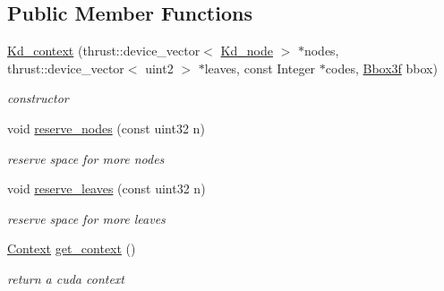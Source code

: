 \subsection*{\-Public \-Member \-Functions}
\begin{DoxyCompactItemize}
\item 
\hypertarget{structnih_1_1cuda_1_1kd_1_1_kd__context_ab65e1eae4bb0d30693b5b2a7a2155afa}{
\hyperlink{structnih_1_1cuda_1_1kd_1_1_kd__context_ab65e1eae4bb0d30693b5b2a7a2155afa}{\-Kd\-\_\-context} (thrust\-::device\-\_\-vector$<$ \hyperlink{structnih_1_1_kd__node}{\-Kd\-\_\-node} $>$ $\ast$nodes, thrust\-::device\-\_\-vector$<$ uint2 $>$ $\ast$leaves, const \-Integer $\ast$codes, \hyperlink{structnih_1_1_bbox}{\-Bbox3f} bbox)}
\label{structnih_1_1cuda_1_1kd_1_1_kd__context_ab65e1eae4bb0d30693b5b2a7a2155afa}

\begin{DoxyCompactList}\small\item\em constructor \end{DoxyCompactList}\item 
\hypertarget{structnih_1_1cuda_1_1kd_1_1_kd__context_a37662afab45803d4cdc90af6e98d5d74}{
void \hyperlink{structnih_1_1cuda_1_1kd_1_1_kd__context_a37662afab45803d4cdc90af6e98d5d74}{reserve\-\_\-nodes} (const uint32 n)}
\label{structnih_1_1cuda_1_1kd_1_1_kd__context_a37662afab45803d4cdc90af6e98d5d74}

\begin{DoxyCompactList}\small\item\em reserve space for more nodes \end{DoxyCompactList}\item 
\hypertarget{structnih_1_1cuda_1_1kd_1_1_kd__context_a69c93f66508e6fa8f10e7d21d77d0224}{
void \hyperlink{structnih_1_1cuda_1_1kd_1_1_kd__context_a69c93f66508e6fa8f10e7d21d77d0224}{reserve\-\_\-leaves} (const uint32 n)}
\label{structnih_1_1cuda_1_1kd_1_1_kd__context_a69c93f66508e6fa8f10e7d21d77d0224}

\begin{DoxyCompactList}\small\item\em reserve space for more leaves \end{DoxyCompactList}\item 
\hypertarget{structnih_1_1cuda_1_1kd_1_1_kd__context_a90b3e77ba2b9eaf6851117bb07cc06be}{
\hyperlink{structnih_1_1cuda_1_1kd_1_1_kd__context_1_1_context}{\-Context} \hyperlink{structnih_1_1cuda_1_1kd_1_1_kd__context_a90b3e77ba2b9eaf6851117bb07cc06be}{get\-\_\-context} ()}
\label{structnih_1_1cuda_1_1kd_1_1_kd__context_a90b3e77ba2b9eaf6851117bb07cc06be}

\begin{DoxyCompactList}\small\item\em return a cuda context \end{DoxyCompactList}\end{DoxyCompactItemize}
